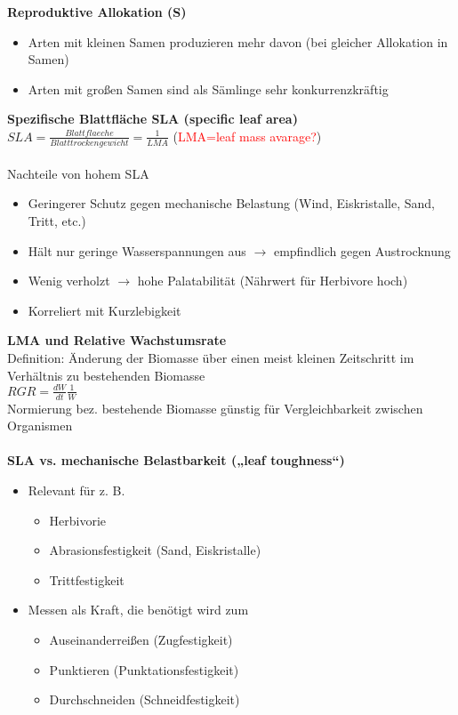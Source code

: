 \newpage
\textbf{Reproduktive Allokation (S)}
\begin{itemize}
	\item Arten mit kleinen Samen produzieren mehr davon (bei gleicher Allokation in Samen)
	\item Arten mit großen Samen sind als Sämlinge sehr konkurrenzkräftig
\end{itemize}

\textbf{Spezifische Blattfläche SLA (specific leaf area)}\\
$SLA=\frac{Blattflaeche}{Blatttrockengewicht}=\frac{1}{LMA}$ (\textcolor{red}{LMA=leaf mass avarage?})\\\\

Nachteile von hohem SLA
\begin{itemize}
	\item Geringerer Schutz gegen mechanische Belastung (Wind, Eiskristalle, Sand, Tritt, etc.)
	\item Hält nur geringe Wasserspannungen aus $\rightarrow$ empfindlich gegen Austrocknung
	\item Wenig verholzt $\rightarrow$ hohe Palatabilität (Nährwert für Herbivore hoch)
	\item Korreliert mit Kurzlebigkeit
\end{itemize}

\textbf{LMA und Relative Wachstumsrate}\\
Definition: Änderung der Biomasse über einen meist kleinen Zeitschritt im Verhältnis zu bestehenden Biomasse\\
$RGR=\frac{dW}{dt}\frac{1}{W}$\\
Normierung bez. bestehende Biomasse günstig für Vergleichbarkeit zwischen Organismen
\\\\
\textbf{SLA vs. mechanische Belastbarkeit („leaf toughness“)}
\begin{itemize}
	\item Relevant für z. B.
	\begin{itemize}
		\item Herbivorie
		\item Abrasionsfestigkeit (Sand, Eiskristalle)
		\item Trittfestigkeit
	\end{itemize}
	\item Messen als Kraft, die benötigt wird zum
	\begin{itemize}
		\item Auseinanderreißen (Zugfestigkeit)
		\item Punktieren (Punktationsfestigkeit)
		\item  Durchschneiden (Schneidfestigkeit)
	\end{itemize}
\end{itemize}

